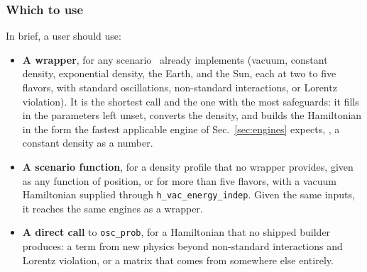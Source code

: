 \subsubsection{Which to use}

In brief, a user should use:
\begin{itemize}
\item \textbf{A wrapper}, for any scenario \magnus\ already implements (vacuum, constant density, exponential density, the Earth, and the Sun, each at two to five flavors, with standard oscillations, non-standard interactions, or Lorentz violation). It is the shortest call and the one with the most safeguards: it fills in the parameters left unset, converts the density, and builds the Hamiltonian in the form the fastest applicable engine of Sec.~\ref{sec:engines} expects, \eg, a constant density as a number.
\item \textbf{A scenario function}, for a density profile that no wrapper provides, given as any function of position, or for more than five flavors, with a vacuum Hamiltonian supplied through {\tt h\_vac\_energy\_indep}. Given the same inputs, it reaches the same engines as a wrapper.
\item \textbf{A direct call} to {\tt osc\_prob}, for a Hamiltonian that no shipped builder produces: a term from new physics beyond non-standard interactions and Lorentz violation, or a matrix that comes from somewhere else entirely.
\end{itemize}
